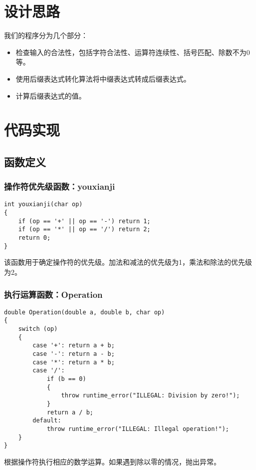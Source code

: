\documentclass[UTF8]{ctexart}
\begin{document}
\pagestyle{fancy}
\fancyhead{}

\section{设计思路}
我们的程序分为几个部分：
\begin{itemize}
    \item 检查输入的合法性，包括字符合法性、运算符连续性、括号匹配、除数不为0等。
    \item 使用后缀表达式转化算法将中缀表达式转成后缀表达式。
    \item 计算后缀表达式的值。
\end{itemize}

\section{代码实现}

\subsection{函数定义}

\subsubsection{操作符优先级函数：youxianji}
\begin{verbatim}
int youxianji(char op) 
{
    if (op == '+' || op == '-') return 1;
    if (op == '*' || op == '/') return 2;
    return 0;
}
\end{verbatim}
该函数用于确定操作符的优先级。加法和减法的优先级为1，乘法和除法的优先级为2。

\subsubsection{执行运算函数：Operation}
\begin{verbatim}
double Operation(double a, double b, char op) 
{
    switch (op) 
    {
        case '+': return a + b;
        case '-': return a - b;
        case '*': return a * b;
        case '/':
            if (b == 0) 
            {
                throw runtime_error("ILLEGAL: Division by zero!");
            }
            return a / b;
        default:
            throw runtime_error("ILLEGAL: Illegal operation!");
    }
}
\end{verbatim}
根据操作符执行相应的数学运算。如果遇到除以零的情况，抛出异常。
\end{document}
